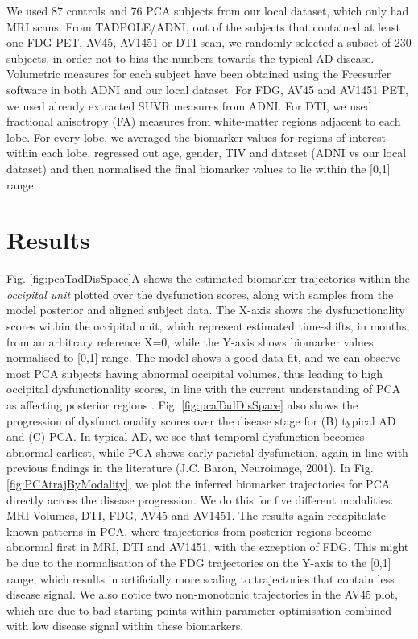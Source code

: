 \documentclass{llncs}
\begin{document}
We used 87 controls and 76 PCA subjects from our local dataset, which only had MRI scans. From TADPOLE/ADNI, out of the subjects that contained at least one FDG PET, AV45, AV1451 or DTI scan, we randomly selected a subset of 230 subjects, in order not to bias the numbers towards the typical AD disease.  Volumetric measures for each subject have been obtained using the Freesurfer software in both ADNI and our local dataset. For FDG, AV45 and AV1451 PET, we used already extracted SUVR measures from ADNI. For DTI, we used fractional anisotropy (FA) measures from white-matter regions adjacent to each lobe. For every lobe, we averaged the biomarker values for regions of interest within each lobe, regressed out age, gender, TIV and dataset (ADNI vs our local dataset) and then normalised the final biomarker values to lie within the [0,1] range.

\section{Results}

Fig. \ref{fig:pcaTadDisSpace}A shows the estimated biomarker trajectories within the \emph{occipital unit} plotted over the dysfunction scores, along with samples from the model posterior and aligned subject data. The X-axis shows the dysfunctionality scores within the occipital unit, which represent estimated time-shifts, in months, from an arbitrary reference X=0, while the Y-axis shows biomarker values normalised to [0,1] range. The model shows a good data fit, and we can observe most PCA subjects having abnormal occipital volumes, thus leading to high occipital dysfunctionality scores, in line with the current understanding of PCA as affecting posterior regions \cite{crutch2012posterior}. Fig. \ref{fig:pcaTadDisSpace} also shows the progression of dysfunctionality scores over the disease stage for (B) typical AD and (C) PCA. In typical AD, we see that temporal dysfunction becomes abnormal earliest, while PCA shows early parietal dysfunction, again in line with previous findings in the literature \cite{crutch2012posterior} (J.C. Baron, Neuroimage, 2001). In Fig. \ref{fig:PCAtrajByModality}, we plot the inferred biomarker trajectories for PCA directly across the disease progression. We do this for five different modalities: MRI Volumes, DTI, FDG, AV45 and AV1451. The results again recapitulate known patterns in PCA, where trajectories from posterior regions become abnormal first in MRI, DTI and AV1451, with the exception of FDG. This might be due to the normalisation of the FDG trajectories on the Y-axis to the [0,1] range, which results in artificially more scaling to trajectories that contain less disease signal. We also notice two non-monotonic trajectories in the AV45 plot, which are due to bad starting points within parameter optimisation combined with low disease signal within these biomarkers.
\end{document}
